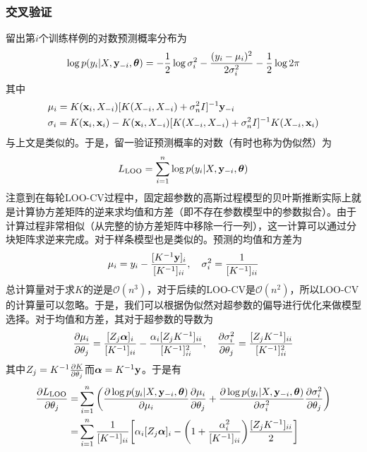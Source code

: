 \documentclass[12pt,UTF8]{article}
\begin{document}
            \subsubsection{交叉验证}
                留出第$i$个训练样例的对数预测概率分布为
                \begin{equation}
                    \log{p(y_i|X,\vb{y}_{-i},\vb*{\theta})}=-\frac{1}{2}\log{\sigma_i^2}-\frac{(y_i-\mu_i)^2}{2\sigma_i^2}-\frac{1}{2}\log{2\pi}
                \end{equation}
                其中
                \begin{align}
                    &\mu_i=K(\vb{x}_i,X_{-i})[K(X_{-i},X_{-i})+\sigma_n^2I]^{-1}\vb{y}_{-i} \\
                    &\sigma_i=K(\vb{x}_i,\vb{x}_i)-K(\vb{x}_i,X_{-i})[K(X_{-i},X_{-i})+\sigma_n^2I]^{-1}K(X_{-i},\vb{x}_i)
                \end{align}
                与上文是类似的。于是，留一验证预测概率的对数（有时也称为伪似然）为
                \begin{equation}
                    L_{\mathrm{LOO}}=\sum_{i=1}^n{\log{p(y_i|X,\vb{y}_{-i},\vb*{\theta})}}
                \end{equation}
                注意到在每轮LOO-CV过程中，固定超参数的高斯过程模型的贝叶斯推断实际上就是计算协方差矩阵的逆来求均值和方差（即不存在参数模型中的参数拟合）。由于计算过程非常相似（从完整的协方差矩阵中移除一行一列），这一计算可以通过分块矩阵求逆来完成。对于样条模型也是类似的。预测的均值和方差为
                \begin{equation}
                    \mu_i=y_i-\frac{[K^{-1}\vb{y}]_i}{[K^{-1}]_{ii}}\qc\sigma_i^2=\frac{1}{[K^{-1}]_{ii}}
                \end{equation}
                总计算量对于求$K$的逆是$\mathcal{O}(n^3)$，对于后续的LOO-CV是$\mathcal{O}(n^2)$，所以LOO-CV的计算量可以忽略。于是，我们可以根据伪似然对超参数的偏导进行优化来做模型选择。对于均值和方差，其对于超参数的导数为
                \begin{equation}
                    \pdv{\mu_i}{\theta_j}=\frac{[Z_j\vb*{\alpha}]_i}{[K^{-1}]_{ii}}-\frac{\alpha_i[Z_jK^{-1}]_{ii}}{[K^{-1}]_{ii}^2}\qc\pdv{\sigma_i^2}{\theta_j}=\frac{[Z_jK^{-1}]_{ii}}{[K^{-1}]_{ii}^2}
                \end{equation}
                其中$Z_j=K^{-1}\pdv{K}{\theta_j}$而$\vb*{\alpha}=K^{-1}\vb{y}$。于是有
                \begin{align}
                    \pdv{L_{\mathrm{LOO}}}{\theta_j}=&\sum_{i=1}^n{\qty(\pdv{\log{p(y_i|X,\vb{y}_{-i},\vb*{\theta})}}{\mu_i}\pdv{\mu_i}{\theta_j}+\pdv{\log{p(y_i|X,\vb{y}_{-i},\vb*{\theta})}}{\sigma_i^2}\pdv{\sigma_i^2}{\theta_j})} \\
                    =&\sum_{i=1}^n{\frac{1}{[K^{-1}]_{ii}}\qty[\alpha_i[Z_j\vb*{\alpha}]_i-\qty(1+\frac{\alpha_i^2}{[K^{-1}]_{ii}})\frac{[Z_jK^{-1}]_{ii}}{2}]}
                \end{align}
\end{document}
